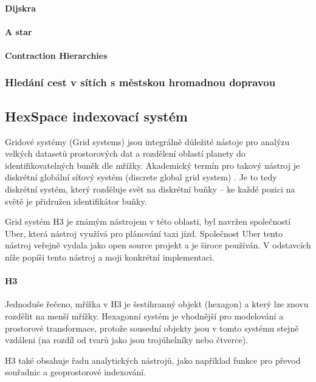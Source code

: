 \documentclass[thesis=M,czech]{FITthesis}[2019/12/23]
\theoremstyle{plain}
\theoremstyle{definition}
\begin{document}
\paragraph{Dijskra}
\paragraph{A star}
\paragraph{Contraction Hierarchies}
\subsubsection{Hledání cest v sítích s městskou hromadnou dopravou}

\subsection{HexSpace indexovací systém} \label{HexSpace indexovací systém}

Gridové systémy (Grid systems) jsou integrálně důležité nástoje pro analýzu velkých datasetů prostorových dat a rozdělení oblastí planety do identifikovatelných buněk dle mřížky. Akademický termín pro takový nástroj je diskrétní globální síťový systém (discrete global grid system) \cite{discrete-global-grid}. Je to tedy diskrétní systém, který rozděluje svět na diskrétní buňky -- ke každé pozici na světě je přidružen identifikátor buňky.


Grid systém H3 je známým nástrojem v této oblasti, byl navržen společností Uber, která nástroj využívá pro plánování taxi jízd. Společnost Uber tento nástroj veřejně vydala jako open source projekt a je široce používán. V odstavcích níže popíši tento nástroj a moji konkrétní implementaci.


\paragraph{H3}

Jednoduše řečeno, mřížka v H3 je šestihranný objekt (hexagon) a který lze znovu rozdělit na menší mřížky. Hexagonní systém je vhodnější pro modelování a prostorové transformace, protože sousední objekty jsou v tomto systému stejně vzdáleni (na rozdíl od tvarů jako jsou trojúhelníky nebo čtverce). 

H3 také obsahuje řadu analytických nástrojů, jako například funkce pro převod souřadnic a geoprostorové indexování.
\end{document}
